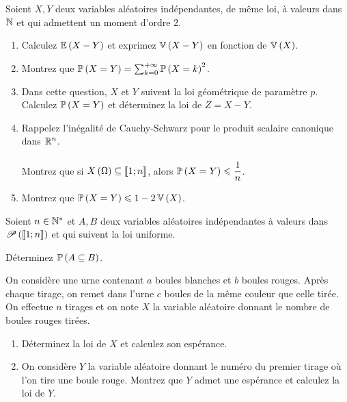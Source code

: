 \begin{exo}
Soient \(X,Y\) deux variables aléatoires indépendantes, de même loi, à valeurs dans \(\mathbb{N}\) et qui admettent un moment d'ordre \(2\).

\begin{enumerate}
    \item Calculez \(\operatorname{\mathbb{E}}\left(X-Y\right)\) et exprimez \(\operatorname{\mathbb{V}}\left(X-Y\right)\) en fonction de \(\operatorname{\mathbb{V}}\left(X\right)\). \\
    \item Montrez que \(\mathbb{P}\left(X=Y\right)=\sum_{k=0}^{+\infty}\mathbb{P}\left(X=k\right)^2\). \\
    \item Dans cette question, \(X\) et \(Y\) suivent la loi géométrique de paramètre \(p\). Calculez \(\mathbb{P}\left(X=Y\right)\) et déterminez la loi de \(Z=X-Y\). \\
    \item Rappelez l'inégalité de Cauchy-Schwarz pour le produit scalaire canonique dans \(\mathbb{R}^n\). \\\\ Montrez que si \(X\left(\Omega\right)\subseteq\left\llbracket1;n\right\rrbracket\), alors \(\mathbb{P}\left(X=Y\right)\leqslant\dfrac{1}{n}\). \\
    \item Montrez que \(\mathbb{P}\left(X=Y\right)\leqslant1-2\operatorname{\mathbb{V}}\left(X\right)\).
\end{enumerate}
\end{exo}

\begin{exo}
Soient \(n\in\mathbb{N}^*\) et \(A,B\) deux variables aléatoires indépendantes à valeurs dans \(\mathscr{P}\left(\left\llbracket1;n\right\rrbracket\right)\) et qui suivent la loi uniforme.

Déterminez \(\mathbb{P}\left(A\subseteq B\right)\).
\end{exo}

\begin{exo}
On considère une urne contenant \(a\) boules blanches et \(b\) boules rouges. Après chaque tirage, on remet dans l'urne \(c\) boules de la même couleur que celle tirée. On effectue \(n\) tirages et on note \(X\) la variable aléatoire donnant le nombre de boules rouges tirées.

\begin{enumerate}
    \item Déterminez la loi de \(X\) et calculez son espérance. \\
    \item On considère \(Y\) la variable aléatoire donnant le numéro du premier tirage où l'on tire une boule rouge. Montrez que \(Y\) admet une espérance et calculez la loi de \(Y\).
\end{enumerate}
\end{exo}

